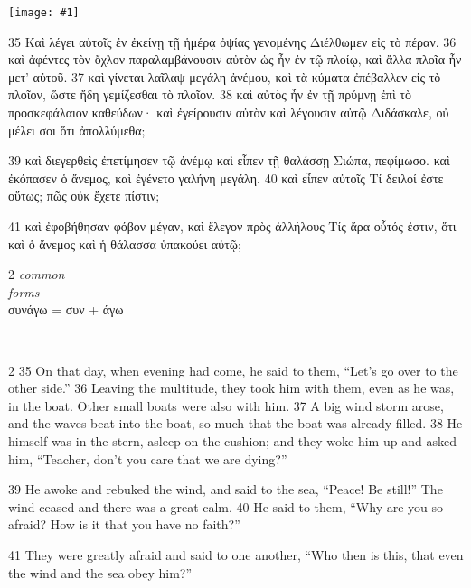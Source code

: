 \documentclass[10pt,a5paper,twoside,twocolumn]{book}
\newcommand{\fig}[1]{\texttt{[image: \#1]}\label{fig:#1}}
\newcommand*\cleartoleftpage{%
  \ifodd\value{page}\hbox{}\clearpage\fi
}
\newcommand{\separator}{
  \vspace{-0.5\baselineskip}%
  \hspace{0.27\textwidth}%
  \noindent\makebox[\linewidth]{\resizebox{0.3333\linewidth}{1pt}{$\bullet$}}\bigskip%
  \vspace{-0.5\baselineskip}
}
\newenvironment{facing}{\cleartoleftpage}{\clearpage\pagebreak}
\newenvironment{help}{\clearpage}{}
\newenvironment{helpsec}{\begin{minipage}[t]{\textwidth}\begin{multicols}{2}}{\end{multicols}\end{minipage}}
\newenvironment{vocab}{\begin{helpsec}}{\end{helpsec}}
\newenvironment{translation}{\separator\\\begin{helpsec}\footnotesize}{\end{helpsec}}
\begin{document}
\begin{facing}

\fig{04-39} %

	35 Καὶ λέγει αὐτοῖς ἐν ἐκείνῃ τῇ ἡμέρᾳ ὀψίας γενομένης Διέλθωμεν εἰς τὸ πέραν. 36 καὶ ἀφέντες τὸν ὄχλον παραλαμβάνουσιν αὐτὸν ὡς ἦν ἐν τῷ πλοίῳ, καὶ ἄλλα πλοῖα ἦν μετ’ αὐτοῦ. 37 καὶ γίνεται λαῖλαψ μεγάλη ἀνέμου, καὶ τὰ κύματα ἐπέβαλλεν εἰς τὸ πλοῖον, ὥστε ἤδη γεμίζεσθαι τὸ πλοῖον. 38 καὶ αὐτὸς ἦν ἐν τῇ πρύμνῃ ἐπὶ τὸ προσκεφάλαιον καθεύδων· καὶ ἐγείρουσιν αὐτὸν καὶ λέγουσιν αὐτῷ Διδάσκαλε, οὐ μέλει σοι ὅτι ἀπολλύμεθα; 

39 καὶ διεγερθεὶς ἐπετίμησεν τῷ ἀνέμῳ καὶ εἶπεν τῇ θαλάσσῃ Σιώπα, πεφίμωσο. καὶ ἐκόπασεν ὁ ἄνεμος, καὶ ἐγένετο γαλήνη μεγάλη. 40 καὶ εἶπεν αὐτοῖς Τί δειλοί ἐστε οὕτως; πῶς οὐκ ἔχετε πίστιν; 

41 καὶ ἐφοβήθησαν φόβον μέγαν, καὶ ἔλεγον πρὸς ἀλλήλους Τίς ἄρα οὗτός ἐστιν, ὅτι καὶ ὁ ἄνεμος καὶ ἡ θάλασσα ὑπακούει αὐτῷ;


\begin{help}
\begin{vocab}
\emph{common}\\

\emph{forms}\\
συνάγω = συν + άγω \\
\end{vocab}
\begin{translation}
35 On that day, when evening had come, he said to them, ``Let's go over to the other side.'' 36 Leaving the multitude, they took him with them, even as he was, in the boat. Other small boats were also with him. 37 A big wind storm arose, and the waves beat into the boat, so much that the boat was already filled. 38 He himself was in the stern, asleep on the cushion; and they woke him up and asked him, ``Teacher, don't you care that we are dying?''

39 He awoke and rebuked the wind, and said to the sea, ``Peace! Be still!'' The wind ceased and there was a great calm. 40 He said to them, ``Why are you so afraid? How is it that you have no faith?''

41 They were greatly afraid and said to one another, ``Who then is this, that even the wind and the sea obey him?'' 

\end{translation}
\end{help}
\end{facing}
\end{document}
